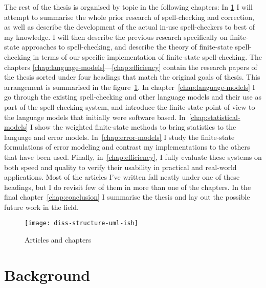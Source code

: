\documentclass[officiallayout,draft]{unihelcompling}
\begin{document}
The rest of the thesis is organised by topic in the following chapters: In
\ref{chap:background} I will attempt to summarise the whole prior research of
spell-checking and correction, as well as describe the development of the
actual in-use spell-checkers to best of my knowledge. I will then describe the
previous research specifically on finite-state approaches to spell-checking,
and describe the theory of finite-state spell-checking in terms of our specific
implementation of finite-state spell-checking. The chapters
\ref{chap:language-models}---\ref{chap:efficiency} contain the research papers
of the thesis sorted under four headings that match the original goals of
thesis. This arrangement is summarised in the
figure~\ref{fig:articles-chapters}. In chapter~\ref{chap:language-models} I go
through the existing spell-checking and other language models and their use as
part of the spell-checking system, and introduce the finite-state point of view
to the language models that initially were software based.
In~\ref{chap:statistical-models} I show the weighted finite-state methods to
bring statistics to the language and error models. In~\ref{chap:error-models}
I study the finite-state formulations of error modeling and contrast my
implementations to the others that have been used. Finally, 
in~\ref{chap:efficiency}, I fully evaluate these systems on both speed and
quality to verify their usability in practical and real-world applications.
Most of the articles I've written fall neatly under one of these headings, but I do revisit few of them in more than one of the chapters. In the final 
chapter~\ref{chap:conclusion} I summarise the thesis and lay out the possible
future work in the field.

\begin{figure}
    \texttt{[image: diss-structure-uml-ish]}
    \caption{Articles and chapters
    \label{fig:articles-chapters}}
\end{figure}

\chapter{Background}
\label{chap:background}
\end{document}
